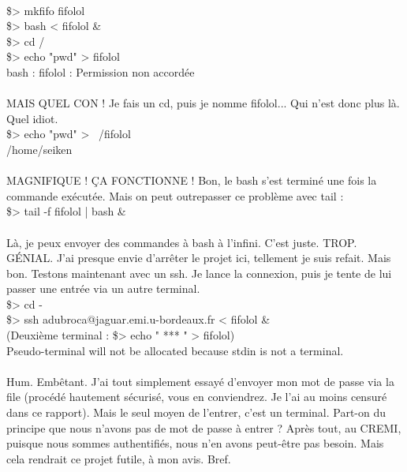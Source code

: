 \\\$> mkfifo fifolol
\\\$> bash < fifolol \&
\\\$> cd /
\\\$> echo "pwd" > fifolol
\\bash : fifolol : Permission non accordée
\\\\
MAIS QUEL CON ! Je fais un cd, puis je nomme fifolol... Qui n'est donc plus là. Quel idiot.
\\\$> echo "pwd" > ~/fifolol
\\/home/seiken
\\\\
MAGNIFIQUE ! ÇA FONCTIONNE ! Bon, le bash s'est terminé une fois la commande exécutée. Mais on peut outrepasser ce problème avec tail :
\\\$> tail -f fifolol | bash \&
\\\\
Là, je peux envoyer des commandes à bash à l'infini. C'est juste. TROP. GÉNIAL. J'ai presque envie d'arrêter le projet ici, tellement je suis refait. Mais bon. Testons maintenant avec un ssh. Je lance la connexion, puis je tente de lui passer une entrée via un autre terminal.
\\\$> cd -
\\\$> ssh adubroca@jaguar.emi.u-bordeaux.fr < fifolol \&
\\(Deuxième terminal : \$> echo " *** " > fifolol)
\\Pseudo-terminal will not be allocated because stdin is not a terminal.
\\\\
Hum. Embêtant. J'ai tout simplement essayé d'envoyer mon mot de passe via la file (procédé hautement sécurisé, vous en conviendrez. Je l'ai au moins censuré dans ce rapport). Mais le seul moyen de l'entrer, c'est un terminal. Part-on du principe que nous n'avons pas de mot de passe à entrer ? Après tout, au CREMI, puisque nous sommes authentifiés, nous n'en avons peut-être pas besoin. Mais cela rendrait ce projet futile, à mon avis. Bref.